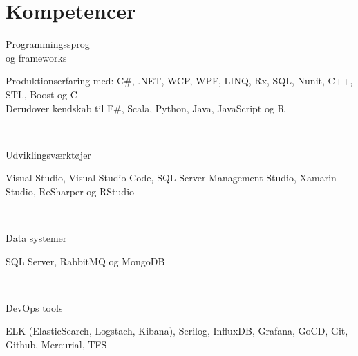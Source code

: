 \documentclass[10pt, a4paper]{article}
\begin{document}
\section{Kompetencer}
\begin{Row}%
  \begin{Cell}{1}
    Programmingssprog \\[1ex]
    og frameworks
  \end{Cell}
  \begin{Cell}{3}
    Produktionserfaring med: C\#, .NET, WCP, WPF, LINQ, Rx, SQL, Nunit,  %
    C++, STL, Boost og C \\
    Derudover kendskab til F\#, Scala, Python, Java, JavaScript og R
  \end{Cell}
\end{Row}
\\[0.5cm]
\begin{Row}%
  \begin{Cell}{1}
    Udviklingsværktøjer
  \end{Cell}
  \begin{Cell}{3}
    Visual Studio, Visual Studio Code, SQL Server Management Studio, Xamarin
    Studio, ReSharper og RStudio
  \end{Cell}
\end{Row}
\\[0.5cm]
\begin{Row}%
  \begin{Cell}{1}
    Data systemer
  \end{Cell}
  \begin{Cell}{3}
    SQL Server, RabbitMQ og MongoDB
  \end{Cell}
\end{Row}
\\[0.5cm]\begin{Row}%
  \begin{Cell}{1}
    DevOps tools
  \end{Cell}
  \begin{Cell}{3}
    ELK (ElasticSearch, Logstach, Kibana), Serilog, InfluxDB, Grafana, GoCD, Git, Github, Mercurial, TFS
  \end{Cell}
\end{Row}
\end{document}
